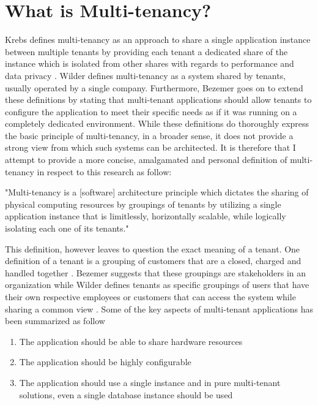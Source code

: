 \section{What is Multi-tenancy?}

Krebs defines multi-tenancy as an approach to share a single application instance between multiple tenants by providing each tenant a dedicated share of the instance which is isolated from other shares with regards to performance and data privacy \cite{Krebs2012}.
Wilder \cite{Wilder2012-so} defines multi-tenancy as a system shared by tenants, usually operated by a single company. Furthermore, Bezemer goes on to extend these definitions by stating that multi-tenant applications should allow tenants to configure the application to meet their specific needs as if it was running on a completely dedicated environment\cite{Bezemer:2010:MSA:1862372.1862393}. While these definitions do thoroughly express the basic principle of multi-tenancy, in a broader sense, it does not provide a strong view from which such systems can be architected. It is therefore that I attempt to provide a more concise, amalgamated and personal definition of multi-tenancy in respect to this research as follow:
\begin{fancyquotes}
"Multi-tenancy is a [software] architecture principle which dictates the sharing of physical computing resources by groupings of tenants by utilizing a single application instance that is limitlessly, horizontally scalable, while logically isolating each one of its tenants."
\end{fancyquotes}
This definition, however leaves to question the exact meaning of a tenant. One definition of a tenant is a grouping of customers that are a closed, charged and handled together \cite{Krebs2012}. Bezemer suggests that these groupings are stakeholders in an organization  \cite{Bezemer:2010:MSA:1862372.1862393} while Wilder defines tenants as specific groupings of users that have their own respective employees or customers that can access the system while sharing a common view \cite{Wilder2012-so}.
Some of the key aspects of multi-tenant applications has been summarized as follow \cite{Bezemer:2010:MSA:1862372.1862393}
\begin{enumerate}
\item The application should be able to share hardware resources
\item The application should be highly configurable
\item  The application should use a single instance and in pure multi-tenant solutions, even a single database instance should be used
\end{enumerate}

